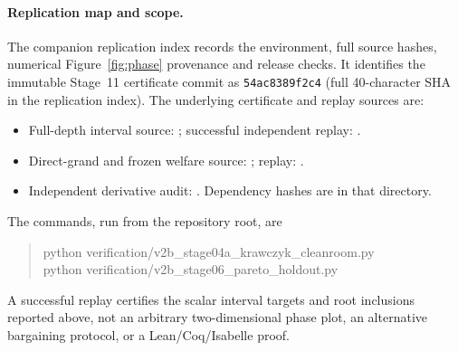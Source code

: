 \paragraph{Replication map and scope.}
The companion replication index records the environment, full source hashes, numerical Figure~\ref{fig:phase} provenance and release checks. It identifies the immutable Stage~11 certificate commit as \texttt{54ac8389f2c4} (full 40-character SHA in the replication index). The underlying certificate and replay sources are:
\begin{itemize}\setlength\itemsep{1pt}
\item Full-depth interval source: ; successful independent replay: .
\item Direct-grand and frozen welfare source: ; replay: .
\item Independent derivative audit: . Dependency hashes are in that directory.
\end{itemize}
The commands, run from the repository root, are
\begin{quote}\small\ttfamily
python verification/v2b\_stage04a\_krawczyk\_cleanroom.py\\
python verification/v2b\_stage06\_pareto\_holdout.py
\end{quote}
A successful replay certifies the scalar interval targets and root inclusions reported above, not an arbitrary two-dimensional phase plot, an alternative bargaining protocol, or a Lean/Coq/Isabelle proof.

